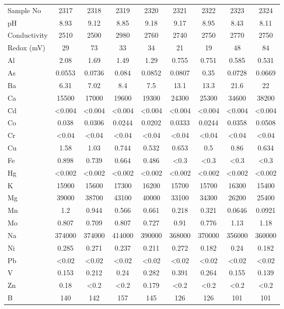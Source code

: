 \documentclass[algorithms,article,submit,pdftex,moreauthors]{Definitions/mdpi}
\begin{document}
\begin{scriptsize}
\begin{center}
\begin{longtable}{@{\extracolsep{\fill}}|p{1.8cm}|cccccccc|@{}}
Sample No & 2317 & 2318 & 2319 & 2320 & 2321 & 2322 & 2323 & 2324  \\
pH & 8.93 & 9.12 & 8.85 & 9.18 & 9.17 & 8.95 & 8.43 & 8.11  \\
Conductivity & 2510 & 2500 & 2980 & 2760 & 2740 & 2750 & 2770 & 2750  \\
Redox (mV) & 29 & 73 & 33 & 34 & 21 & 19 & 48 & 84  \\
Al & 2.08 & 1.69 & 1.49 & 1.29 & 0.755 & 0.751 & 0.585 & 0.531  \\
As & 0.0553 & 0.0736 & 0.084 & 0.0852 & 0.0807 & 0.35 & 0.0728 & 0.0669  \\
Ba & 6.31 & 7.02 & 8.4 & 7.5 & 13.1 & 13.3 & 21.6 & 22  \\
Ca & 15500 & 17000 & 19600 & 19300 & 24300 & 25300 & 34600 & 38200  \\
Cd & <0.004 & <0.004 & <0.004 & <0.004 & <0.004 & <0.004 & <0.004 & <0.004  \\
Co & 0.038 & 0.0306 & 0.0244 & 0.0202 & 0.0333 & 0.0244 & 0.0358 & 0.0508  \\
Cr & <0.04 & <0.04 & <0.04 & <0.04 & <0.04 & <0.04 & <0.04 & <0.04  \\
Cu & 1.58 & 1.03 & 0.744 & 0.532 & 0.653 & 0.5 & 0.86 & 0.634  \\
Fe & 0.898 & 0.739 & 0.664 & 0.486 & <0.3 & <0.3 & <0.3 & <0.3  \\
Hg & <0.002 & <0.002 & <0.002 & <0.002 & <0.002 & <0.002 & <0.002 & <0.002  \\
K & 15900 & 15600 & 17300 & 16200 & 15700 & 15700 & 16300 & 15400  \\
Mg & 39000 & 38700 & 43100 & 40000 & 33100 & 34300 & 26200 & 25400  \\
Mn & 1.2 & 0.944 & 0.566 & 0.661 & 0.218 & 0.321 & 0.0646 & 0.0921  \\
Mo & 0.807 & 0.709 & 0.807 & 0.727 & 0.91 & 0.776 & 1.13 & 1.18  \\
Na & 374000 & 374000 & 414000 & 390000 & 368000 & 370000 & 356000 & 360000  \\
Ni & 0.285 & 0.271 & 0.237 & 0.211 & 0.272 & 0.182 & 0.24 & 0.182  \\
Pb & <0.02 & <0.02 & <0.02 & <0.02 & <0.02 & <0.02 & <0.02 & <0.02  \\
V & 0.153 & 0.212 & 0.24 & 0.282 & 0.391 & 0.264 & 0.155 & 0.139  \\
Zn & 0.18 & <0.2 & <0.2 & 0.179 & <0.2 & <0.2 & <0.2 & <0.2  \\
B & 140 & 142 & 157 & 145 & 126 & 126 & 101 & 101  \\

\end{longtable}
\end{center}
\end{scriptsize}
\end{document}
